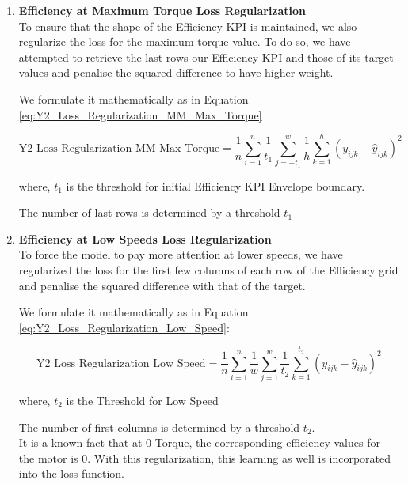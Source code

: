 \documentclass{report} %
\begin{document}
\begin{enumerate}
\begin{enumerate}

\item \textbf{Efficiency at Maximum Torque Loss Regularization} \\

To ensure that the shape of the Efficiency \ac{KPI} is maintained, we also regularize the loss for the maximum torque value.
To do so, we have attempted to retrieve the last rows our Efficiency \ac{KPI} and those of its target values and penalise the squared difference to have higher weight.

We formulate it mathematically as in Equation \ref{eq:Y2_Loss_Regularization_MM_Max_Torque}

\begin{equation}
    \text{Y2 Loss Regularization MM Max Torque} = \frac{1}{n} \sum_{i=1}^{n} \frac{1}{t_{1}} \sum_{j=-t_{1}}^{w} \frac{1}{h} \sum_{k=1}^{h} (y_{ijk} - \hat{y}_{ijk})^2
    \label{eq:Y2_Loss_Regularization_MM_Max_Torque}
\end{equation}

where, \(t_{1}\) is the threshold for initial Efficiency \ac{KPI} Envelope boundary.

The number of last rows is determined by a threshold $t_{1}$

\item \textbf{Efficiency at Low Speeds Loss Regularization} \\

To force the model to pay more attention at lower speeds, we have regularized the loss for the first few columns of each row of the Efficiency grid and penalise the squared difference with that of the target.

We formulate it mathematically as in Equation \ref{eq:Y2_Loss_Regularization_Low_Speed}:

\begin{equation}
    \text{Y2 Loss Regularization Low Speed} = \frac{1}{n} \sum_{i=1}^{n} \frac{1}{w} \sum_{j=1}^{w} \frac{1}{t_{2}} \sum_{k=1}^{t_{2}} (y_{ijk} - \hat{y}_{ijk})^2
    \label{eq:Y2_Loss_Regularization_Low_Speed}
\end{equation}

where, \(t_{2}\) is the Threshold for Low Speed

The number of first columns is determined by a threshold $t_{2}$. \\
It is a known fact that at 0 Torque, the corresponding efficiency values for the motor is 0. With this regularization, this learning as well is incorporated into the loss function.\\


\end{enumerate}
\end{enumerate}
\end{document}
